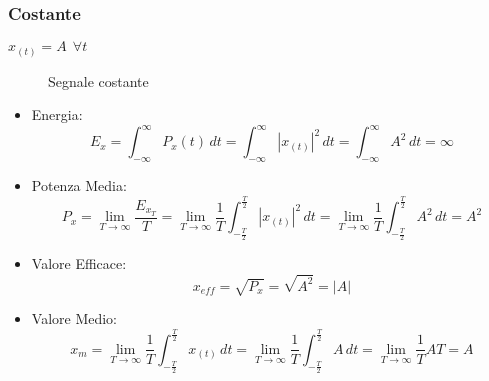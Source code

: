         \subsubsection{Costante}
            $x_{(t)} = A\ \ \forall t$
            \begin{figure}[h]
                \centering
                \caption{Segnale costante}
                \label{fig:segnale costante}
            \end{figure}
            \begin{itemize}
                \item {Energia:
                        \[
                            E_{x} = \int_{-\infty}^{\infty} P_{x}(t) \,dt = \int_{-\infty}^{\infty} |x_{(t)}|^2 \,dt = \int_{-\infty}^{\infty} A^2 \,dt = \infty 
                        \]
                }
                \item {Potenza Media:
                        \[
                            P_{x} = \lim_{T\rightarrow\infty} \frac{E_{x_{T}}}{T} = \lim_{T\rightarrow\infty} \frac{1}{T} \int_{-\frac{T}{2}}^{\frac{T}{2}}  |x_{(t)}|^2 \,dt = \lim_{T\rightarrow\infty} \frac{1}{T} \int_{-\frac{T}{2}}^{\frac{T}{2}} A^2 \,dt = A^2     
                        \]
                }
                \item {Valore Efficace:
                        \[
                            x_{eff} = \sqrt{P_{x}} = \sqrt{A^2} = |A|
                        \]
                }
                \item {Valore Medio:
                        \[
                            x_{m} = \lim_{T\rightarrow\infty} \frac{1}{T} \int_{-\frac{T}{2}}^{\frac{T}{2}}  x_{(t)} \,dt = \lim_{T\rightarrow\infty} \frac{1}{T} \int_{-\frac{T}{2}}^{\frac{T}{2}}  A \,dt = \lim_{T\rightarrow\infty} \frac{1}{T} AT = A 
                        \]
                }
            \end{itemize}
        
